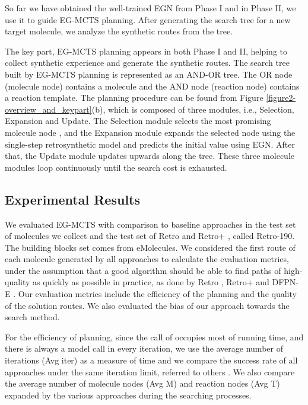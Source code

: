 \documentclass[sn-mathphys,Numbered]{sn-jnl}
\begin{document}
So far we have obtained the well-trained EGN from Phase I and in Phase II, we use it to guide EG-MCTS planning. After generating the search tree for a new target molecule, we analyze the synthetic routes from the tree.

The key part, EG-MCTS planning appears in both Phase I and II, helping to collect synthetic experience and generate the synthetic routes. The search tree built by EG-MCTS planning is represented as an AND-OR tree. The OR node (molecule node) contains a molecule and the AND node (reaction node) contains a reaction template.
The planning procedure can be found from Figure \ref{figure2-overview_and_keypart}(b), which is composed of three modules, i.e., Selection, Expansion and Update. The Selection module selects the most promising molecule node , and the Expansion module expands the selected node using the single-step retrosynthetic model and predicts the initial value using EGN. After that, the Update module updates upwards along the tree.
These three molecule modules loop continuously until the search cost is exhausted.

\subsection{Experimental Results}\label{emol-exp}
We evaluated EG-MCTS with comparison to baseline approaches in the test set of  molecules we collect and the test set of Retro \cite{retro2020} and Retro+ \cite{2022}, called Retro-190. The building blocks set  comes from eMolecules.
We considered the first route of each molecule generated by all approaches to calculate the evaluation metrics, under the assumption that a good algorithm should be able to find paths of high-quality as quickly as possible in practice, as done by Retro \citep{retro2020}, Retro+ \citep{2022} and DFPN-E \citep{DFPN-E2019}. 
Our evaluation metrics include the efficiency of the planning and the quality of the solution routes. We also evaluated the bias of our approach towards the search method.

For the efficiency of planning, since the call of  occupies most of running time, and there is always a model call in every iteration, we use the average number of iterations (Avg iter) as a measure of time and we compare the success rate of all approaches under the same iteration limit, referred to others \cite{retro2020,2022,DFPN-E2019}. We also compare the average number of molecule nodes (Avg M) and reaction nodes (Avg T) expanded by the various approaches during the searching processes.  
\end{document}
